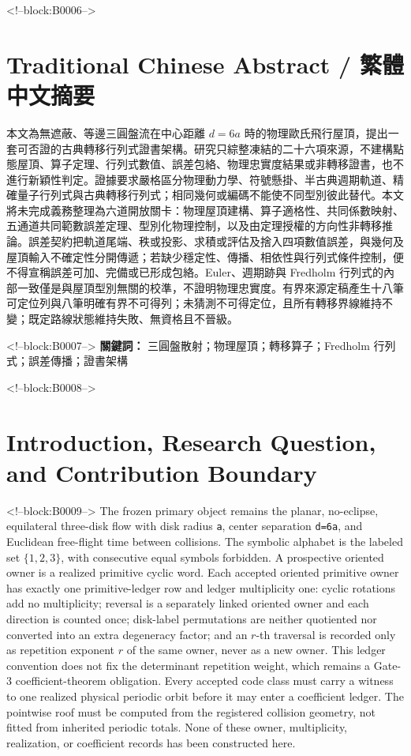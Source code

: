 \documentclass[11pt,a4paper]{article}
\begin{document}
<!--block:B0006-->
\begin{otherlanguage}{chinese-traditional}
\section*{Traditional Chinese Abstract / 繁體中文摘要}
本文為無遮蔽、等邊三圓盤流在中心距離 \(d=6a\) 時的物理歐氏飛行屋頂，提出一套可否證的古典轉移行列式證書架構。研究只綜整凍結的二十六項來源，不建構點態屋頂、算子定理、行列式數值、誤差包絡、物理忠實度結果或非轉移證書，也不進行新穎性判定。證據要求嚴格區分物理動力學、符號懸掛、半古典週期軌道、精確量子行列式與古典轉移行列式；相同幾何或編碼不能使不同型別彼此替代。本文將未完成義務整理為六道開放關卡：物理屋頂建構、算子適格性、共同係數映射、五通道共同範數誤差定理、型別化物理控制，以及由定理授權的方向性非轉移推論。誤差契約把軌道尾端、秩或投影、求積或評估及捨入四項數值誤差，與幾何及屋頂輸入不確定性分開傳遞；若缺少穩定性、傳播、相依性與行列式條件控制，便不得宣稱誤差可加、完備或已形成包絡。Euler、週期跡與 Fredholm 行列式的內部一致僅是與屋頂型別無關的校準，不證明物理忠實度。有界來源定稿產生十八筆可定位列與八筆明確有界不可得列；未猜測不可得定位，且所有轉移界線維持不變；既定路線狀態維持失敗、無資格且不晉級。

<!--block:B0007-->
\noindent\textbf{關鍵詞：} 三圓盤散射；物理屋頂；轉移算子；Fredholm 行列式；誤差傳播；證書架構
\end{otherlanguage}

<!--block:B0008-->
\section{Introduction, Research Question, and Contribution Boundary}

<!--block:B0009-->
The frozen primary object remains the planar, no-eclipse, equilateral three-disk flow with disk radius \texttt{a}, center separation \texttt{d=6a}, and Euclidean free-flight time between collisions. The symbolic alphabet is the labeled set \(\{1,2,3\}\), with consecutive equal symbols forbidden. A prospective oriented owner is a realized primitive cyclic word. Each accepted oriented primitive owner has exactly one primitive-ledger row and ledger multiplicity one: cyclic rotations add no multiplicity; reversal is a separately linked oriented owner and each direction is counted once; disk-label permutations are neither quotiented nor converted into an extra degeneracy factor; and an \(r\)-th traversal is recorded only as repetition exponent \(r\) of the same owner, never as a new owner. This ledger convention does not fix the determinant repetition weight, which remains a Gate-3 coefficient-theorem obligation. Every accepted code class must carry a witness to one realized physical periodic orbit before it may enter a coefficient ledger. The pointwise roof must be computed from the registered collision geometry, not fitted from inherited periodic totals. None of these owner, multiplicity, realization, or coefficient records has been constructed here.
\end{document}
